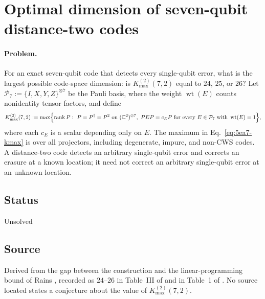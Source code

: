 \section{Optimal dimension of seven-qubit distance-two codes}
\label{sec:op_5ea7cb9abb281829}

\paragraph{Problem.}
For an exact seven-qubit code that detects every single-qubit error, what is
the largest possible code-space dimension: is $K_{\max}^{(2)}(7,2)$ equal to
$24$, $25$, or $26$?  Let $\mathcal P_7:=\{I,X,Y,Z\}^{\otimes7}$ be the Pauli
basis, where the weight $\operatorname{wt}(E)$ counts nonidentity tensor
factors, and define
\begin{equation}
  K_{\max}^{(2)}(7,2):=\max\Bigl\{\operatorname{rank}P:\
  P=P^\dagger=P^2\ \text{on}\ (\mathbb C^2)^{\otimes7},\
  PEP=c_EP\ \text{for every}\ E\in\mathcal P_7\ \text{with}\
  \operatorname{wt}(E)=1\Bigr\},
  \label{eq:5ea7-kmax}
\end{equation}
where each $c_E$ is a scalar depending only on $E$.  The maximum in
Eq.~\eqref{eq:5ea7-kmax} is over all projectors, including degenerate, impure,
and non-CWS codes.  A distance-two code detects an arbitrary single-qubit error
and corrects an erasure at a known location; it need not correct an arbitrary
single-qubit error at an unknown location.

\subsection*{Status}

Unsolved

\subsection*{Source}

Derived from the gap between the construction and the linear-programming
bound of Rains , recorded as $24$--$26$ in
Table~III of  and in Table~1 of
\sourcecite{ref:5ea7-amh}{AMH26}.  No source located states a conjecture about
the value of $K_{\max}^{(2)}(7,2)$.

